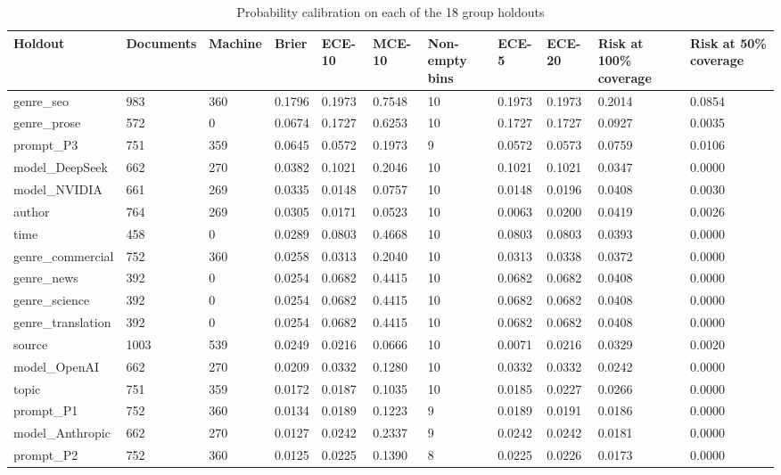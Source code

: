 \begin{table}[htbp]
\centering
\scriptsize
\caption{Probability calibration on each of the 18 group holdouts}
\label{tab:s6}
\begin{tabular}{lllllllllll}
\toprule
Holdout & Documents & Machine & Brier & ECE-10 & MCE-10 & Non-empty bins & ECE-5 & ECE-20 & Risk at 100\% coverage & Risk at 50\% coverage \\
\midrule
genre\_seo & 983 & 360 & 0.1796 & 0.1973 & 0.7548 & 10 & 0.1973 & 0.1973 & 0.2014 & 0.0854 \\
genre\_prose & 572 & 0 & 0.0674 & 0.1727 & 0.6253 & 10 & 0.1727 & 0.1727 & 0.0927 & 0.0035 \\
prompt\_P3 & 751 & 359 & 0.0645 & 0.0572 & 0.1973 & 9 & 0.0572 & 0.0573 & 0.0759 & 0.0106 \\
model\_DeepSeek & 662 & 270 & 0.0382 & 0.1021 & 0.2046 & 10 & 0.1021 & 0.1021 & 0.0347 & 0.0000 \\
model\_NVIDIA & 661 & 269 & 0.0335 & 0.0148 & 0.0757 & 10 & 0.0148 & 0.0196 & 0.0408 & 0.0030 \\
author & 764 & 269 & 0.0305 & 0.0171 & 0.0523 & 10 & 0.0063 & 0.0200 & 0.0419 & 0.0026 \\
time & 458 & 0 & 0.0289 & 0.0803 & 0.4668 & 10 & 0.0803 & 0.0803 & 0.0393 & 0.0000 \\
genre\_commercial & 752 & 360 & 0.0258 & 0.0313 & 0.2040 & 10 & 0.0313 & 0.0338 & 0.0372 & 0.0000 \\
genre\_news & 392 & 0 & 0.0254 & 0.0682 & 0.4415 & 10 & 0.0682 & 0.0682 & 0.0408 & 0.0000 \\
genre\_science & 392 & 0 & 0.0254 & 0.0682 & 0.4415 & 10 & 0.0682 & 0.0682 & 0.0408 & 0.0000 \\
genre\_translation & 392 & 0 & 0.0254 & 0.0682 & 0.4415 & 10 & 0.0682 & 0.0682 & 0.0408 & 0.0000 \\
source & 1003 & 539 & 0.0249 & 0.0216 & 0.0666 & 10 & 0.0071 & 0.0216 & 0.0329 & 0.0020 \\
model\_OpenAI & 662 & 270 & 0.0209 & 0.0332 & 0.1280 & 10 & 0.0332 & 0.0332 & 0.0242 & 0.0000 \\
topic & 751 & 359 & 0.0172 & 0.0187 & 0.1035 & 10 & 0.0185 & 0.0227 & 0.0266 & 0.0000 \\
prompt\_P1 & 752 & 360 & 0.0134 & 0.0189 & 0.1223 & 9 & 0.0189 & 0.0191 & 0.0186 & 0.0000 \\
model\_Anthropic & 662 & 270 & 0.0127 & 0.0242 & 0.2337 & 9 & 0.0242 & 0.0242 & 0.0181 & 0.0000 \\
prompt\_P2 & 752 & 360 & 0.0125 & 0.0225 & 0.1390 & 8 & 0.0225 & 0.0226 & 0.0173 & 0.0000 \\

\end{tabular}
\end{table}
